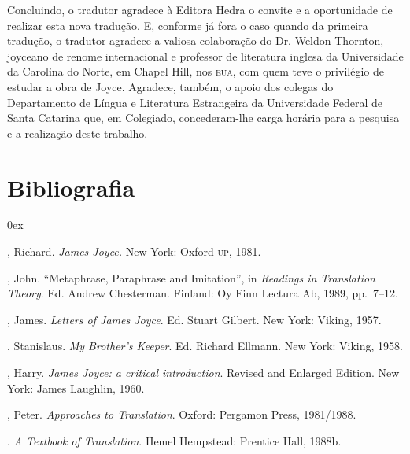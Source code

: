 Concluindo, o tradutor agradece à Editora Hedra o convite e a oportunidade de
realizar esta nova tradução.  E, conforme já fora o caso quando da primeira
tradução, o tradutor agradece a valiosa colaboração do Dr. Weldon Thornton,
joyceano de renome internacional e professor de literatura inglesa da
Universidade da Carolina do Norte, em Chapel Hill, nos \textsc{eua}, com quem teve o
privilégio de estudar a obra de Joyce.  Agradece, também, o apoio dos colegas
do Departamento de Língua e Literatura Estrangeira da Universidade Federal de
Santa Catarina que, em Colegiado, concederam-lhe carga horária para a pesquisa
e a realização deste trabalho.

\section{Bibliografia}

\begin{description}0ex
\newcommand{\tit}[1]{\item[\textnormal{\textsc{\MakeTextLowercase{#1}}}]}
\newcommand{\titidem}{\item[\line(1,0){25}]}

\tit{Ellmann}, Richard. \textit{James Joyce.} New York: Oxford \textsc{up},
1981.

\tit{Dryden}, John. “Metaphrase, Paraphrase and Imitation”, in
\textit{Readings in Translation Theory}. Ed. Andrew Chesterman.  Finland: Oy
Finn Lectura Ab, 1989, pp.~7--12.

\tit{Joyce}, James. \textit{Letters of James Joyce}. Ed. Stuart Gilbert. New
York: Viking, 1957.

\tit{Joyce}, Stanislaus. \textit{My Brother’s Keeper}. Ed. Richard Ellmann.
New York: Viking, 1958.

\tit{Levin}, Harry. \textit{James Joyce: a critical introduction}. Revised
and Enlarged Edition. New York: James Laughlin, 1960.

\tit{Newmark}, Peter. \textit{Approaches to Translation}. Oxford: Pergamon
Press, 1981/1988.

\titidem. \textit{A Textbook of Translation}. Hemel Hempstead: Prentice Hall,
1988b.

\end{description}

